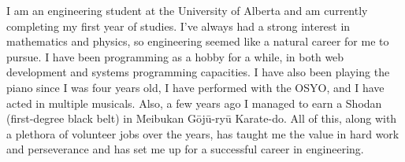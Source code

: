 

\begin{cvparagraph}

I am an engineering student at the University of Alberta and am currently completing my first year of studies. I've always had a strong interest in mathematics and physics, so engineering seemed like a natural career for me to pursue. I have been programming as a hobby for a while, in both web development and systems programming capacities. I have also been playing the piano since I was four years old, I have performed with the OSYO, and I have acted in multiple musicals. Also, a few years ago I managed to earn a Shodan (first-degree black belt) in Meibukan Gōjū-ryū Karate-do. All of this, along with a plethora of volunteer jobs over the years, has taught me the value in hard work and perseverance and has set me up for a successful career in engineering.
\end{cvparagraph}
